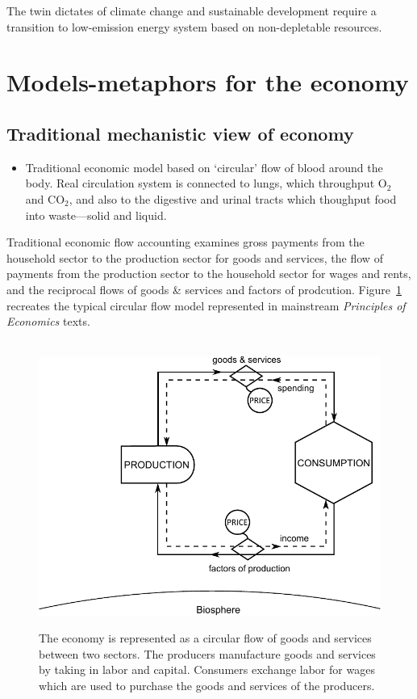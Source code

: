 The twin dictates of climate change and 
sustainable development require a transition to 
low-emission energy system based on 
non-depletable resources. 

\section{Models-metaphors for the economy}

\subsection{Traditional mechanistic view of economy}

\begin{itemize}
	\item{Traditional economic model based on `circular' flow of blood around the body. 
	Real circulation system is connected to lungs, which throughput O$_2$ and CO$_2$, 
	and also to the digestive and urinal tracts which thoughput food into waste---solid and liquid.}
\end{itemize}

Traditional economic flow accounting examines gross payments 
from the household sector to the production sector for goods and services, the flow of payments from the production sector 
to the household sector for wages and rents, and the reciprocal flows of goods \& services and factors of prodcution. Figure~\ref{fig:perp_motion_1} 
recreates the typical circular flow model represented in mainstream \emph{Principles of Economics} texts.

\begin{figure}[!ht]
\label{fig:perp_motion_1}
\centering\
\includegraphics[width=\linewidth]{Part_0/Chapter_Introduction/images/Perpetual_motion_1.pdf}
\caption[The traditional economic model of the economy]{The economy 
is represented as a circular flow of goods and services between two sectors. 
The producers manufacture goods and services 
by taking in labor and capital. 
Consumers exchange labor for wages 
which are used to purchase 
the goods and services of the producers.}
\end{figure}

